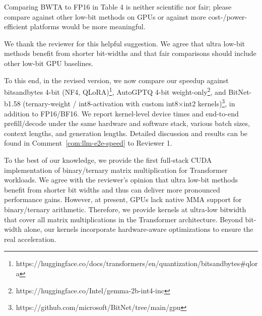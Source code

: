 \begin{revcomment}
Comparing BWTA to FP16 in Table 4 is neither scientific nor fair; please compare against other low-bit methods on GPUs or against more cost-/power-efficient platforms would be more meaningful. 


\end{revcomment}
\begin{revresponse}[]

We thank the reviewer for this helpful suggestion. We agree that ultra low-bit methods benefit from shorter bit-widths and that fair comparisons should include other low-bit GPU baselines. 

To this end, in the revised version, we now compare our speedup against bitsandbytes 4-bit (NF4, QLoRA)\footnote{https://huggingface.co/docs/transformers/en/quantization/bitsandbytes\#qlora}, AutoGPTQ 4-bit weight-only\footnote{https://huggingface.co/Intel/gemma-2b-int4-inc}, and BitNet-b1.58 (ternary-weight / int8-activation with custom int8$\times$int2 kernels)\footnote{https://github.com/microsoft/BitNet/tree/main/gpu}, in addition to FP16/BF16. We report kernel-level device times and end-to-end prefill/decode under the same hardware and software stack, various batch sizes, context lengths, and generation lengths. Detailed discussion and results can be found in Comment~\ref{com:llm-e2e-speed} to Reviewer 1. 

To the best of our knowledge, we provide the first full-stack CUDA implementation of binary/ternary matrix multiplication for Transformer workloads. 
We agree with the reviewer's opinion that ultra low-bit methods benefit from shorter bit widths and thus can deliver more pronounced performance gains. However, at present, GPUs lack native MMA support for binary/ternary arithmetic. 
Therefore, we provide kernels at ultra-low bitwidth that cover all matrix multiplications in the Transformer architecture. Beyond bit-width alone, our kernels incorporate hardware-aware optimizations to ensure the real acceleration. 
\end{revresponse}


